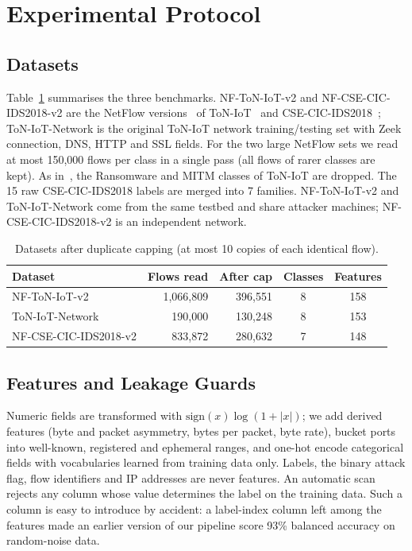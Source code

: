 \documentclass[journal]{IEEEtran}
\begin{document}
\section{Experimental Protocol}
\label{sec:protocol}

\subsection{Datasets}
Table~\ref{tab:datasets} summarises the three benchmarks. NF-ToN-IoT-v2 and NF-CSE-CIC-IDS2018-v2 are the NetFlow versions~\cite{sarhan2022standard} of ToN-IoT~\cite{moustafa2021toniot} and CSE-CIC-IDS2018~\cite{sharafaldin2018cicids}; ToN-IoT-Network is the original ToN-IoT network training/testing set with Zeek connection, DNS, HTTP and SSL fields. For the two large NetFlow sets we read at most 150{,}000 flows per class in a single pass (all flows of rarer classes are kept). As in~\cite{altfaily2025fedgatsage}, the Ransomware and MITM classes of ToN-IoT are dropped. The 15 raw CSE-CIC-IDS2018 labels are merged into 7 families.
NF-ToN-IoT-v2 and ToN-IoT-Network come from the same testbed and share attacker machines; NF-CSE-CIC-IDS2018-v2 is an independent network.

\begin{table}[t]
\centering
\caption{Datasets after duplicate capping (at most 10 copies of each identical flow).}
\label{tab:datasets}
\setlength{\tabcolsep}{4pt}
\footnotesize
\begin{tabular}{@{}lrrcc@{}}
\toprule
Dataset & Flows read & After cap & Classes & Features \\
\midrule
NF-ToN-IoT-v2 & 1{,}066{,}809 & 396{,}551 & 8 & 158 \\
ToN-IoT-Network & 190{,}000 & 130{,}248 & 8 & 153 \\
NF-CSE-CIC-IDS2018-v2 & 833{,}872 & 280{,}632 & 7 & 148 \\
\bottomrule
\end{tabular}
\end{table}

\subsection{Features and Leakage Guards}
Numeric fields are transformed with $\mathrm{sign}(x)\log(1+|x|)$; we add derived features (byte and packet asymmetry, bytes per packet, byte rate), bucket ports into well-known, registered and ephemeral ranges, and one-hot encode categorical fields with vocabularies learned from training data only. Labels, the binary attack flag, flow identifiers and IP addresses are never features. An automatic scan rejects any column whose value determines the label on the training data. Such a column is easy to introduce by accident: a label-index column left among the features made an earlier version of our pipeline score 93\% balanced accuracy on random-noise data.
\end{document}
